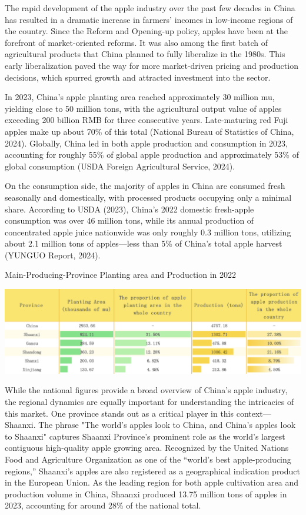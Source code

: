 The rapid development of the apple industry over the past few decades in China has resulted in a dramatic increase in farmers’ incomes in low-income regions of the country. Since the Reform and Opening-up policy, apples have been at the forefront of market-oriented reforms. It was also among the first batch of agricultural products that China planned to fully liberalize in the 1980s. This early liberalization paved the way for more market-driven pricing and production decisions, which spurred growth and attracted investment into the sector.

In 2023, China’s apple planting area reached approximately 30 million mu, yielding close to 50 million tons, with the agricultural output value of apples exceeding 200 billion RMB for three consecutive years. Late-maturing red Fuji apples make up about 70\% of this total (National Bureau of Statistics of China, 2024). Globally, China led in both apple production and consumption in 2023, accounting for roughly 55\% of global apple production and approximately 53\% of global consumption (USDA Foreign Agricultural Service, 2024).

On the consumption side, the majority of apples in China are consumed fresh seasonally and domestically, with processed products occupying only a minimal share. According to USDA (2023), China's 2022 domestic fresh-apple consumption was over 46 million tons, while its annual production of concentrated apple juice nationwide was only roughly 0.3 million tons, utilizing about 2.1 million tons of apples—less than 5\% of China’s total apple harvest (YUNGUO Report, 2024).

\begin{table}[hpt]
    \centering
        \caption{Main-Producing-Province Planting area and Production in 2022}
    \includegraphics[width=\linewidth]{Tables/production_provinces_table.png}
    \label{tab: production provinces}
\end{table}


While the national figures provide a broad overview of China’s apple industry, the regional dynamics are equally important for understanding the intricacies of this market. One province stands out as a critical player in this context—Shaanxi. The phrase "The world's apples look to China, and China's apples look to Shaanxi" captures Shaanxi Province's prominent role as the world's largest contiguous high-quality apple growing area. Recognized by the United Nations Food and Agriculture Organization as one of the “world’s best apple-producing regions,” Shaanxi’s apples are also registered as a geographical indication product in the European Union. As the leading region for both apple cultivation area and production volume in China, Shaanxi produced 13.75 million tons of apples in 2023, accounting for around 28\% of the national total.

